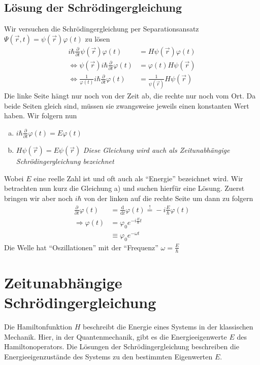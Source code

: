\documentclass[oneside]{book}
\theoremstyle{definition}
\renewcommand{\d}{\mathrm d}
\newcommand{\dd}[1]{\frac{\d}{\d #1}}
\newcommand{\fpartial}[1]{\frac{\partial}{\partial #1}}
\newcommand{\vp}{\varphi}
\begin{document}
\subsection{Lösung der Schrödingergleichung}
Wir versuchen die Schrödingergleichung per Separationsansatz $\Psi(\vec{r}, t) = \psi(\vec{r}) \vp(t)$ zu lösen
\begin{align*}
	i \hbar \fpartial{t} \psi(\vec{r}) \vp(t) &= H \psi(\vec{r}) \vp(t)\\
	\Leftrightarrow \psi(\vec{r}) i \hbar \fpartial{t} \vp(t) &= \vp(t) H \psi(\vec{r})\\
	\Leftrightarrow \frac{1}{\vp(t)} i \hbar \fpartial{t} \vp(t) &= \frac{1}{\psi(\vec{r})} H \psi(\vec{r})
\end{align*}
Die linke Seite hängt nur noch von der Zeit ab, die rechte nur noch vom Ort. Da beide Seiten gleich sind, müssen sie zwangsweise jeweils einen konstanten Wert haben. Wir folgern nun 
\begin{enumerate}[a)]
	 \item $i \hbar \fpartial{t} \vp(t) = E \vp(t)$
	 \item $H \psi(\vec{r}) = E \psi(\vec{r})$ \textit{Diese Gleichung wird auch als Zeitunabhängige Schrödingergleichung bezeichnet}
\end{enumerate}
Wobei $E$ eine reelle Zahl ist und oft auch als "`Energie"' bezeichnet wird. Wir betrachten nun kurz die Gleichung a) und suchen hierfür eine Lösung.
Zuerst bringen wir aber noch $i \hbar$ von der linken auf die rechte Seite um dann zu folgern
\begin{align*}
	\fpartial{t} \vp(t) &= \dd{t} \vp(t) \overset!= - i \frac{E}{\hbar} \vp(t)\\
	\Rightarrow \vp(t) &= \vp_0 e^{-i\frac{E}{\hbar} t}\\
	&\equiv \vp_0 e^{- \omega t}
\end{align*}
Die Welle hat "`Oszillationen"' mit der "`Frequenz"' $\omega = \frac{E}{\hbar}$

\section{Zeitunabhängige Schrödingergleichung}
Die Hamiltonfunktion $H$ beschreibt die Energie eines Systems in der klassischen Mechanik. Hier, in der Quantenmechanik, gibt es die Energieeigenwerte $E$ des Hamiltonoperators. Die Lösungen der Schrödingergleichung beschreiben die Energieeigenzustände des Systems zu den bestimmten Eigenwerten $E$.
\end{document}
